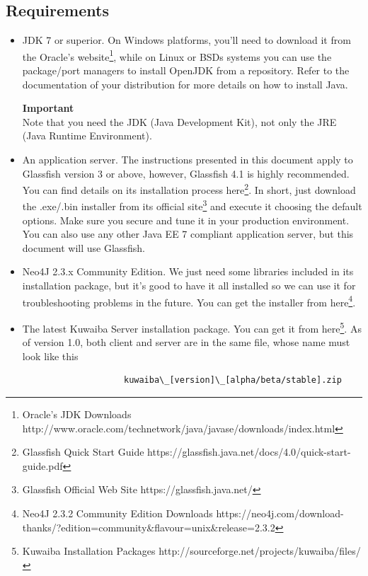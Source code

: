 \documentclass[a4paper]{article}
\begin{document}
		\subsection{Requirements}
			\begin{itemize}
				\item JDK 7 or superior. On Windows platforms, you'll need to download it from the Oracle's website\footnote{Oracle's JDK Downloads http://www.oracle.com/technetwork/java/javase/downloads/index.html}, while on Linux or BSDs systems you can use the package/port managers to install OpenJDK from a repository. Refer to the documentation of your distribution for more details on how to install Java.
				\begin{framed} {\large \textbf{Important}} \\
					Note that you need the JDK (Java Development Kit), not only the JRE (Java Runtime Environment).
				\end{framed}
				\item An application server. The instructions presented in this document apply to Glassfish version 3 or above, however, Glassfish 4.1 is highly recommended. You can find details on its installation process here\footnote{Glassfish Quick Start Guide https://glassfish.java.net/docs/4.0/quick-start-guide.pdf}. In short, just download the .exe/.bin installer from its official site\footnote{Glassfish Official Web Site https://glassfish.java.net/} and execute it choosing the default options. Make sure you secure and tune it in your production environment. You can also use any other Java EE 7 compliant application server, but this document will use Glassfish.
				\item Neo4J 2.3.x Community Edition. We just need some libraries included in its installation package, but it's good to have it all installed so we can use it for troubleshooting problems in the future. You can get the installer from here\footnote {Neo4J 2.3.2 Community Edition Downloads https://neo4j.com/download-thanks/?edition=community\&flavour=unix\&release=2.3.2}.
				\item The latest Kuwaiba Server installation package. You can get it from here\footnote {Kuwaiba Installation Packages http://sourceforge.net/projects/kuwaiba/files/}. As of version 1.0, both client and server are in the same file, whose name must look like this 
		
				\begin{verbatim}
					kuwaiba\_[version]\_[alpha/beta/stable].zip
				\end{verbatim}
				
			\end{itemize}
		
\end{document}
